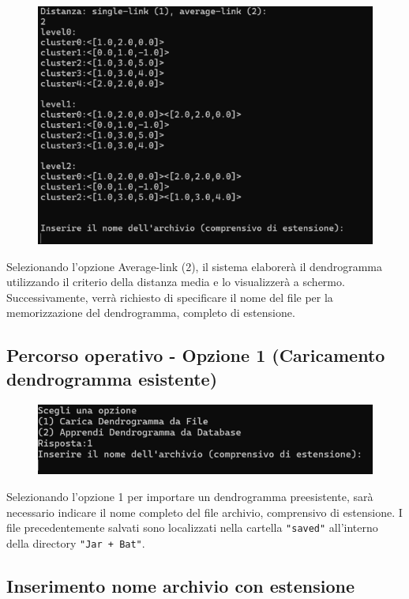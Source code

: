 \begin{figure}[h!]
    \centering
    \includegraphics[width=\textwidth]{images/scelta_averageLink.png}
\end{figure}

Selezionando l'opzione Average-link (2), il sistema elaborerà il dendrogramma utilizzando il criterio della distanza media e lo visualizzerà a schermo. Successivamente, verrà richiesto di specificare il nome del file per la memorizzazione del dendrogramma, completo di estensione.

\subsection{Percorso operativo - Opzione 1 (Caricamento dendrogramma esistente)}
\begin{figure}[h!]
    \centering
    \includegraphics[width=\textwidth]{images/carica_dendrogramma_file.png}
\end{figure}

Selezionando l'opzione 1 per importare un dendrogramma preesistente, sarà necessario indicare il nome completo del file archivio, comprensivo di estensione. I file precedentemente salvati sono localizzati nella cartella \texttt{"saved"} all'interno della directory \texttt{"Jar + Bat"}.

\subsection{Inserimento nome archivio con estensione}

